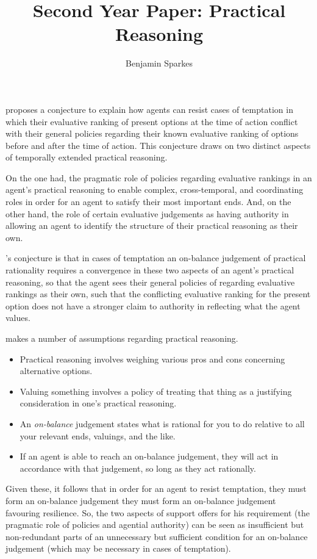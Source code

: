 \documentclass[10pt]{article}
\title{Second Year Paper: Practical Reasoning}
\author{Benjamin Sparkes}
\begin{document}
\citeauthor{Bratman:2007ab} proposes a conjecture to explain how agents can resist cases of temptation in which their evaluative ranking of present options at the time of action conflict with their general policies regarding their known evaluative ranking of options before and after the time of action.
This conjecture draws on two distinct aspects of temporally extended practical reasoning.

On the one had, the pragmatic role of policies regarding evaluative rankings in an agent's practical reasoning to enable complex, cross-temporal, and coordinating roles in order for an agent to satisfy their most important ends.
And, on the other hand, the role of certain evaluative judgements as having authority in allowing an agent to identify the structure of their practical reasoning as their own.

\citeauthor{Bratman:2007ab}'s conjecture is that in cases of temptation an on-balance judgement of practical rationality requires a convergence in these two aspects of an agent's practical reasoning, so that the agent sees their general policies of regarding evaluative rankings as their own, such that the conflicting evaluative ranking for the present option does not have a stronger claim to authority in reflecting what the agent values.

\citeauthor{Bratman:2007ab} makes a number of assumptions regarding practical reasoning.
\begin{itemize}
\item Practical reasoning involves weighing various pros and cons concerning alternative options.
\item Valuing something involves a policy of treating that thing as a justifying consideration in one's practical reasoning.
\item An \emph{on-balance} judgement states what is rational for you to do relative to all your relevant ends, valuings, and the like.
\item If an agent is able to reach an on-balance judgement, they will act in accordance with that judgement, so long as they act rationally.
\end{itemize}

Given these, it follows that in order for an agent to resist temptation, they must form an on-balance judgement they must form an on-balance judgement favouring resilience.
So, the two aspects of support \citeauthor{Bratman:2007ab} offers for his requirement (the pragmatic role of policies and agential authority) can be seen as insufficient but non-redundant parts of an unnecessary but sufficient condition for an on-balance judgement (which may be necessary in cases of temptation).
\end{document}
